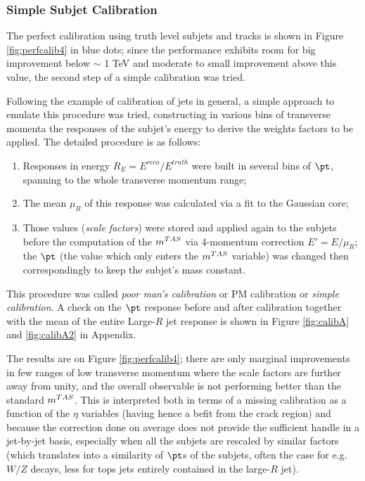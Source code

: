 \subsubsection{Simple Subjet Calibration}
The perfect calibration using truth level subjets and tracks is shown in Figure \ref{fig:perfcalib4} in blue dots; since the performance exhibits room for big improvement below $\sim$ 1 TeV and moderate to small improvement above this value, the second step of a simple calibration was tried.

Following the example of calibration of jets in general, a simple approach to emulate this procedure was tried, constructing in various bins of transverse momenta the responses of the subjet's energy to derive the weights factors to be applied. The detailed procedure is as follows:
\begin{enumerate}
 \item Responses in energy $R_E=E^{reco}/E^{truth}$ were built in several bins of $\pt$, spanning to the whole transverse momentum range;
 \item The mean $\mu_R$ of this response was calculated via a fit to the Gaussian core;
 \item Those values (\textit{scale factors}) were stored and applied again to the subjets before the computation of the $m^{TAS}$ via 4-momentum correction $E'=E/\mu_R$; the $\pt$ (the value which only enters the $m^{TAS}$ variable) was changed then correspondingly to keep the subjet's mass constant.
\end{enumerate}

This procedure was called \textit{poor man's calibration} or PM calibration or \textit{simple calibration}.
A check on the $\pt$ response before and after calibration together with the mean of the entire Large-$R$ jet response is shown in Figure \ref{fig:calibA} and \ref{fig:calibA2} in Appendix.

The results are on Figure \ref{fig:perfcalib4}; there are only marginal improvements in few ranges of low transverse momentum where the scale factors are further away from unity, and the overall observable is not performing better than the standard $m^{TAS}$. This is interpreted both in terms of a missing calibration as a function of the $\eta$ variables (having hence a befit from the crack region) and because the correction done on average does not provide the sufficient handle in a jet-by-jet basis, especially when all the subjets are rescaled by similar factors (which translates into a similarity of $\pt$s of the subjets, often the case for e.g. $W/Z$ decays, less for tops jets entirely contained in the large-$R$ jet).

